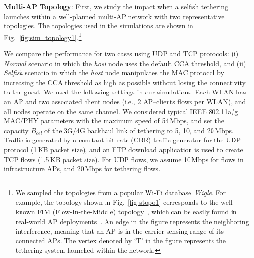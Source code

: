 \textbf{Multi-AP Topology}:
%
First, we study the impact when a selfish tethering launches within
a well-planned multi-AP network with two representative topologies.
%
The topologies used in the simulations are shown in
Fig.~\ref{fig:sim_topology1}.\footnote{We sampled the topologies from
a popular Wi-Fi database~\emph{Wigle}. For example, the topology shown
in Fig.~\ref{fig-stopo1} corresponds to the well-known FIM
(Flow-In-the-Middle) topology~\cite{FIM08}, which can be easily found
in real-world AP deployments~\cite{choi:shin12}. An edge in the
figure represents the neighboring interference, meaning that an AP is
in the carrier sensing range of its connected APs. The vertex denoted
by `T' in the figure represents the tethering system launched within
the network.}
%

We compare the performance for two cases using UDP and TCP protocols:
(i) \emph{Normal} scenario in which the \emph{host} node uses
the default CCA threshold, and (ii) \emph{Selfish} scenario in
which the \emph{host} node manipulates the MAC protocol by increasing
the CCA threshold as high as possible without losing the connectivity
to the guest.
%
We used the following settings in our simulations.
Each WLAN has an AP and two associated client nodes (i.e., 2 AP--clients
flows per WLAN), and all nodes operate on the same channel.
We considered typical IEEE 802.11a/g MAC/PHY parameters with the
maximum speed of 54\,Mbps, and set the capacity $B_{cel}$ of
the 3G/4G backhaul link of tethering to 5, 10, and 20\,Mbps.
Traffic is generated by a constant bit rate (CBR) traffic generator
for the UDP protocol (1\,KB packet size), and an FTP download
application is used to create TCP flows (1.5\,KB packet size).
For UDP flows, we assume 10\,Mbps for flows in infrastructure APs,
and 20\,Mbps for tethering flows.


